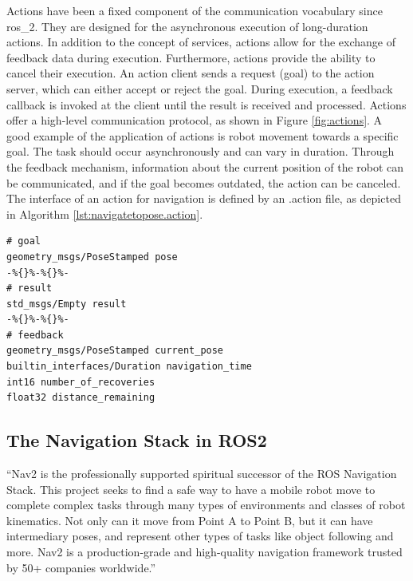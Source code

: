 Actions have been a fixed component of the communication vocabulary since \gls{ros_2}. They are designed for the asynchronous execution of long-duration actions. In addition to the concept of services, actions allow for the exchange of feedback data during execution. Furthermore, actions provide the ability to cancel their execution. An action client sends a request (goal) to the action server, which can either accept or reject the goal. During execution, a feedback callback is invoked at the client until the result is received and processed. Actions offer a high-level communication protocol, as shown in Figure \ref{fig:actions}. A good example of the application of actions is robot movement towards a specific goal. The task should occur asynchronously and can vary in duration. Through the feedback mechanism, information about the current position of the robot can be communicated, and if the goal becomes outdated, the action can be canceled. The interface of an action for navigation is defined by an .action file, as depicted in Algorithm \ref{lst:navigatetopose.action}.

\begin{lstlisting}
# goal
geometry_msgs/PoseStamped pose
-%{}%-%{}%-
# result
std_msgs/Empty result
-%{}%-%{}%-
# feedback
geometry_msgs/PoseStamped current_pose
builtin_interfaces/Duration navigation_time
int16 number_of_recoveries
float32 distance_remaining
\end{lstlisting}
    
\subsection{The Navigation Stack in ROS2}
\label{sec:navigation_stack}

\begin{displayquote}
    \enquote{Nav2 is the professionally supported spiritual successor of the ROS Navigation Stack. This project seeks to find a safe way to have a mobile robot move to complete complex tasks through many types of environments and classes of robot kinematics. Not only can it move from Point A to Point B, but it can have intermediary poses, and represent other types of tasks like object following and more. Nav2 is a production-grade and high-quality navigation framework trusted by 50+ companies worldwide.} \cite{steve_macenski_navigation_2020}
\end{displayquote}

